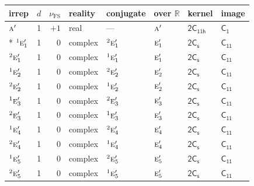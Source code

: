 \documentclass[10pt,a4paper]{article}
\numberwithin{equation}{section}
\newcommand{\grp}[1]{\mathsf{#1}}
\newcommand{\irr}[1]{\text{\normalfont\scshape #1}}
\newcommand{\conjpair}[1]{{}^{#1}}
\newcommand{\fsind}{\nu_{\mathrm{FS}}}
\begin{document}
{\small\renewcommand{\arraystretch}{1.25}\setlength{\tabcolsep}{4pt}\begin{longtable}{@{}lrrlllll@{}}\toprule
irrep & $d$ & $\fsind$ & reality & conjugate & over $\mathbb{R}$ & kernel & image\\\midrule\endhead
\bottomrule\endfoot\endlastfoot
$\irr{a}'$ & 1 & $+1$ & real & --- & $\irr{a}'$ & \href{2C11h.pdf}{$\grp{2C_{11h}}$} & \href{../../../rotation/data/pdf/C1.pdf}{$\grp{C_{1}}$}\\*
$\conjpair{1}\irr{e}_{1}'$ & 1 & $0$ & complex & $\conjpair{2}\irr{e}_{1}'$ & $\irr{e}_{1}'$ & \href{2C1v.pdf}{$\grp{2C_{s}}$} & \href{../../../rotation/data/pdf/C11.pdf}{$\grp{C_{11}}$}\\
$\conjpair{2}\irr{e}_{1}'$ & 1 & $0$ & complex & $\conjpair{1}\irr{e}_{1}'$ & $\irr{e}_{1}'$ & \href{2C1v.pdf}{$\grp{2C_{s}}$} & \href{../../../rotation/data/pdf/C11.pdf}{$\grp{C_{11}}$}\\
$\conjpair{1}\irr{e}_{2}'$ & 1 & $0$ & complex & $\conjpair{2}\irr{e}_{2}'$ & $\irr{e}_{2}'$ & \href{2C1v.pdf}{$\grp{2C_{s}}$} & \href{../../../rotation/data/pdf/C11.pdf}{$\grp{C_{11}}$}\\
$\conjpair{2}\irr{e}_{2}'$ & 1 & $0$ & complex & $\conjpair{1}\irr{e}_{2}'$ & $\irr{e}_{2}'$ & \href{2C1v.pdf}{$\grp{2C_{s}}$} & \href{../../../rotation/data/pdf/C11.pdf}{$\grp{C_{11}}$}\\
$\conjpair{1}\irr{e}_{3}'$ & 1 & $0$ & complex & $\conjpair{2}\irr{e}_{3}'$ & $\irr{e}_{3}'$ & \href{2C1v.pdf}{$\grp{2C_{s}}$} & \href{../../../rotation/data/pdf/C11.pdf}{$\grp{C_{11}}$}\\
$\conjpair{2}\irr{e}_{3}'$ & 1 & $0$ & complex & $\conjpair{1}\irr{e}_{3}'$ & $\irr{e}_{3}'$ & \href{2C1v.pdf}{$\grp{2C_{s}}$} & \href{../../../rotation/data/pdf/C11.pdf}{$\grp{C_{11}}$}\\
$\conjpair{1}\irr{e}_{4}'$ & 1 & $0$ & complex & $\conjpair{2}\irr{e}_{4}'$ & $\irr{e}_{4}'$ & \href{2C1v.pdf}{$\grp{2C_{s}}$} & \href{../../../rotation/data/pdf/C11.pdf}{$\grp{C_{11}}$}\\
$\conjpair{2}\irr{e}_{4}'$ & 1 & $0$ & complex & $\conjpair{1}\irr{e}_{4}'$ & $\irr{e}_{4}'$ & \href{2C1v.pdf}{$\grp{2C_{s}}$} & \href{../../../rotation/data/pdf/C11.pdf}{$\grp{C_{11}}$}\\
$\conjpair{1}\irr{e}_{5}'$ & 1 & $0$ & complex & $\conjpair{2}\irr{e}_{5}'$ & $\irr{e}_{5}'$ & \href{2C1v.pdf}{$\grp{2C_{s}}$} & \href{../../../rotation/data/pdf/C11.pdf}{$\grp{C_{11}}$}\\
$\conjpair{2}\irr{e}_{5}'$ & 1 & $0$ & complex & $\conjpair{1}\irr{e}_{5}'$ & $\irr{e}_{5}'$ & \href{2C1v.pdf}{$\grp{2C_{s}}$} & \href{../../../rotation/data/pdf/C11.pdf}{$\grp{C_{11}}$}\\

\end{longtable}}
\end{document}

